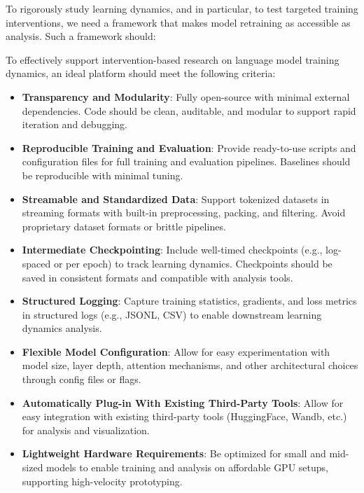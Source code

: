 To rigorously study learning dynamics, and in particular, to test targeted training interventions, we need a framework that makes model retraining as accessible as analysis. Such a framework should:

\begin{tcolorbox}[
    colback=white,
    colframe=thesisblue,
    title=\textbf{Design Requirements for Intervention-Friendly Language Model Platforms},
    fonttitle=\bfseries,
    coltitle=white,
    arc=0mm,
    boxrule=1pt,
    left=10pt,
    right=10pt,
    top=10pt,
    bottom=10pt,
    enhanced,
    breakable
]
To effectively support intervention-based research on language model training dynamics, an ideal platform should meet the following criteria:

\begin{itemize}[label=\cmark]
    \item \textbf{Transparency and Modularity}: Fully open-source with minimal external dependencies. Code should be clean, auditable, and modular to support rapid iteration and debugging.
    
    \item \textbf{Reproducible Training and Evaluation}: Provide ready-to-use scripts and configuration files for full training and evaluation pipelines. Baselines should be reproducible with minimal tuning.
    
    \item \textbf{Streamable and Standardized Data}: Support tokenized datasets in streaming formats with built-in preprocessing, packing, and filtering. Avoid proprietary dataset formats or brittle pipelines.
    
    \item \textbf{Intermediate Checkpointing}: Include well-timed checkpoints (e.g., log-spaced or per epoch) to track learning dynamics. Checkpoints should be saved in consistent formats and compatible with analysis tools.
    
    \item \textbf{Structured Logging}: Capture training statistics, gradients, and loss metrics in structured logs (e.g., JSONL, CSV) to enable downstream learning dynamics analysis.
    
    \item \textbf{Flexible Model Configuration}: Allow for easy experimentation with model size, layer depth, attention mechanisms, and other architectural choices through config files or flags.

    \item \textbf{Automatically Plug-in With Existing Third-Party Tools}: Allow for easy integration with existing third-party tools (HuggingFace, Wandb, etc.) for analysis and visualization.

    
    \item \textbf{Lightweight Hardware Requirements}: Be optimized for small and mid-sized models to enable training and analysis on affordable GPU setups, supporting high-velocity prototyping.
\end{itemize}
\end{tcolorbox}


